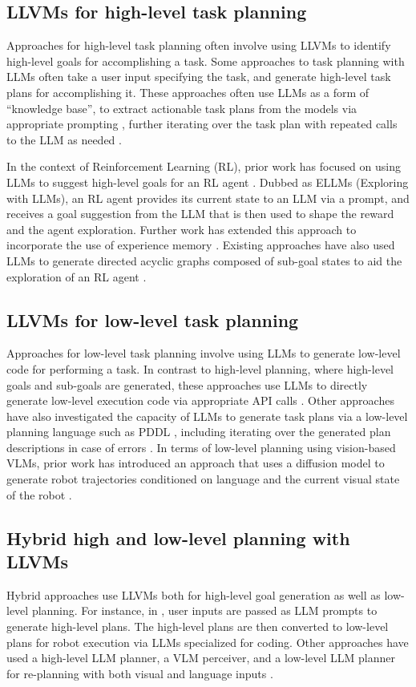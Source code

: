 \subsection{LLVMs for high-level task planning}
Approaches for high-level task planning often involve using LLVMs to identify high-level goals for accomplishing a task. Some approaches to task planning with LLMs often take a user input specifying the task, and generate high-level task plans for accomplishing it. These approaches often use LLMs as a form of ``knowledge base'', to extract actionable task plans from the models via appropriate prompting \cite{huang2022language}, further iterating over the task plan with repeated calls to the LLM as needed \cite{prasad2023adapt}. 



In the context of Reinforcement Learning (RL), prior work has focused on using LLMs to suggest high-level goals for an RL agent \cite{du2023guiding}. Dubbed as ELLMs (Exploring with LLMs), an RL agent provides its current state to an LLM via a prompt, and receives a goal suggestion from the LLM that is then used to shape the reward and the agent exploration. Further work has extended this approach to incorporate the use of experience memory \cite{zhang2023large}. Existing approaches have also used LLMs to generate directed acyclic graphs composed of sub-goal states to aid the exploration of an RL agent \cite{shukla2023lgts}.

\subsection{LLVMs for low-level task planning}
Approaches for low-level task planning involve using LLMs to generate low-level code for performing a task. In contrast to high-level planning, where high-level goals and sub-goals are generated, these approaches use LLMs to directly generate low-level execution code via appropriate API calls \cite{liang2023code}. Other approaches have also investigated the capacity of LLMs to generate task plans via a low-level planning language such as PDDL \cite{silver2023generalized}, including iterating over the generated plan descriptions in case of errors \cite{guan2023leveraging}. In terms of low-level planning using vision-based VLMs, prior work has introduced an approach that uses a diffusion model to generate robot trajectories conditioned on language and the current visual state of the robot \cite{chen2023playfusion}.

\subsection{Hybrid high and low-level planning with LLVMs}
Hybrid approaches use LLVMs both for high-level goal generation as well as low-level planning. For instance, in \cite{li2023interactive}, user inputs are passed as LLM prompts to generate high-level plans. The high-level plans are then converted to low-level plans for robot execution via LLMs specialized for coding. Other approaches have used a high-level LLM planner, a VLM perceiver, and a low-level LLM planner for re-planning with both visual and language inputs \cite{skreta2024replan}.


